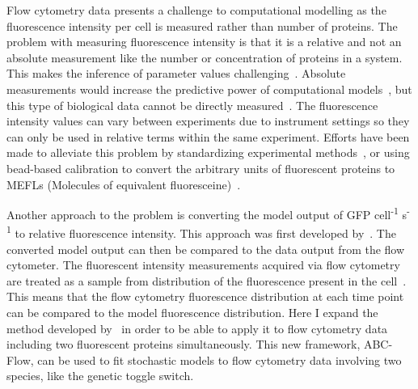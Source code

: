 Flow cytometry data presents a challenge to computational modelling as the fluorescence intensity per cell is measured rather than number of proteins. The problem with measuring fluorescence intensity is that it is a relative and not an absolute measurement like the number or concentration of proteins in a system. This makes the inference of parameter values challenging~\autocite{Rosenfeld:uh}. Absolute measurements would increase the predictive power of computational models~\autocite{Bower:2010jl, Cooling:2010bx}, but this type of biological data cannot be directly measured~\autocite{Kelwick:2014iy}. The fluorescence intensity values can vary between experiments due to instrument settings so they can only be used in relative terms within the same experiment. Efforts have been made to alleviate this problem by standardizing experimental methods~\autocite{Kelly:2009bj}, or using bead-based calibration to convert the arbitrary units of fluorescent proteins to MEFLs (Molecules of equivalent fluoresceine)~\autocite{Beal:2016cd}. 




Another approach to the problem is converting the model output of GFP cell\textsuperscript{-1} s\textsuperscript{-1} to relative fluorescence intensity. This approach was first developed by~\textcite{Lillacci:2013hu}. The converted model output can then be compared to the data output from the flow cytometer. The fluorescent intensity measurements acquired via flow cytometry are treated as a sample from distribution of the fluorescence present in the cell~\autocite{Lillacci:2013hu}. This means that the flow cytometry fluorescence distribution at each time point can be compared to the model fluorescence distribution. Here I expand the method developed by~\textcite{Lillacci:2013hu} in order to be able to apply it to flow cytometry data including two fluorescent proteins simultaneously. This new framework, ABC-Flow, can be used to fit stochastic models to flow cytometry data involving two species, like the genetic toggle switch. 



